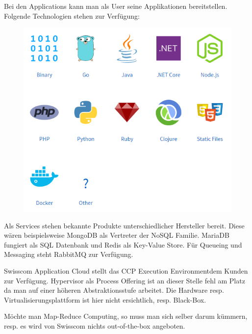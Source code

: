 Bei den Applications kann man als User seine Applikationen bereitstellen. Folgende Technologien stehen zur Verfügung:
\begin{figure}[H]
\centering
\includegraphics[scale=0.7]{images/applications.png}
\end{figure}
Als Services stehen bekannte Produkte unterschiedlicher Hersteller bereit. Diese wären beispielsweise MongoDB als Vertreter der NoSQL Familie. MariaDB fungiert als SQL Datenbank und Redis als Key-Value Store. Für Queueing und Messaging steht RabbitMQ zur Verfügung. 

Swisscom Application Cloud stellt das CCP \glqq Execution Environment\grqq dem Kunden zur Verfügung. Hypervisor als Process Offering ist an dieser Stelle fehl am Platz da man auf einer höheren Abstraktionsstufe arbeitet. Die Hardware resp. Virtualisierungsplattform ist hier nicht ersichtlich, resp. Black-Box. 

Möchte man Map-Reduce Computing, so muss man sich selber darum kümmern, resp. es wird von Swisscom nichts out-of-the-box angeboten.

